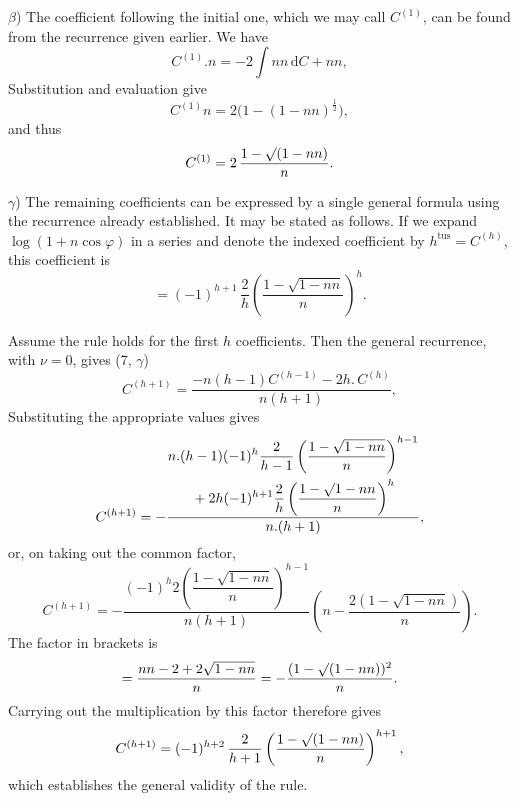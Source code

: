 $\beta$) The coefficient following the initial one, which we may call $C^{(1)}$, can be found from the recurrence
given earlier. We have
\[
C^{(1)} .  n = -2\int nn\,\mathrm{d}C + nn,
\]
Substitution and evaluation give
\[
C^{(1)}n = 2\bigl(1-(1-nn)^{\frac{1}{2}}\bigr),
\]
and thus
\[
C^{(1)} = 2\,\frac{1-\mathord{\surd}(1-nn)}{n}.
\]
\par\noindent\hspace*{\parindent}$\gamma$) The remaining coefficients can be expressed by a single general formula using the recurrence already
established. It may be stated as follows. If we expand $\log(1+n\cos\varphi)$ in a series and denote the indexed
coefficient by $h^{\mathrm{tus}} = C^{(h)}$, this coefficient is
\[
= (-1)^{h+1}\,\frac{2}{h}\left(\frac{1-\sqrt{1-nn}}{n}\right)^{h}.
\]
\par\noindent\hspace*{\parindent}Assume the rule holds for the first $h$ coefficients. Then the general recurrence, with $\nu=0$, gives (7, $\gamma$)
\[
C^{(h+1)} = \frac{-n(h-1)C^{(h-1)}-2h.\,C^{(h)}}{n(h+1)}, 
\]
Substituting the appropriate values gives
\[
C^{(h+1)} = -\frac{\begin{gathered}n.(h-1)(-1)^{h}\dfrac{2}{h-1}\left(\dfrac{1-\sqrt{1-nn}}{n}\right)^{h-1}\\{}+2h(-1)^{h+1}\dfrac{2}{h}\left(\dfrac{1-\mathord{\surd}1-nn}{n}\right)^{h}\end{gathered}}{n.(h+1)},
\]
or, on taking out the common factor,
\[
C^{(h+1)} = -\frac{(-1)^{h}2\left(\dfrac{1-\sqrt{1-nn}}{n}\right)^{h-1}}{n(h+1)}\left(n-\frac{2(1-\sqrt{1-nn})}{n}\right).
\]
The factor in brackets is
\[
= \frac{nn-2+2\sqrt{1-nn}}{n} = -\frac{(1-\mathord{\surd}(1-nn))^{2}}{n}.
\]
Carrying out the multiplication by this factor therefore gives
\[
C^{(h+1)} = (-1)^{h+2}\,\frac{2}{h+1}\left(\frac{1-\mathord{\surd}(1-nn)}{n}\right)^{h+1},
\]
which establishes the general validity of the rule.


